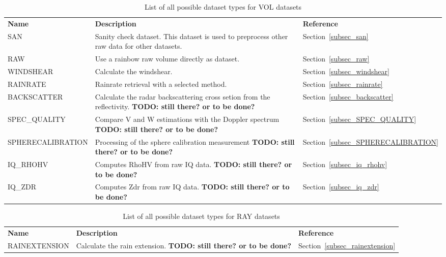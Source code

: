 \documentclass[a4paper,11pt,pdftex,twoside]{scrartcl}
\renewcommand{\bf}{\normalfont \bfseries}
\begin{document}
{{{\begin{table}[H]
\begin{tabularx}{\textwidth}{lXl}
\bf{Name}             & \bf{Description}                                                       & \bf{Reference}\\
SAN                   & Sanity check dataset. This dataset is used to preprocess other raw data for other datasets.   & Section~\ref{subsec_san}\\
RAW                   & Use a rainbow raw volume directly as dataset.                          & Section~\ref{subsec_raw}\\
WINDSHEAR             & Calculate the windshear.                                               & Section~\ref{subsec_windshear}\\
RAINRATE         & Rainrate retrieval with a selected method.                                                   & Section~\ref{subsec_rainrate}\\
BACKSCATTER           & Calculate the radar backscattering cross setion from the reflectivity. {\bf TODO: still there? or to be done? } & Section~\ref{subsec_backscatter}\\
SPEC\_QUALITY         & Compare V and W estimations with the Doppler spectrum {\bf TODO: still there? or to be done? }                 & Section~\ref{subsec_SPEC_QUALITY}\\
SPHERECALIBRATION     & Processing of the sphere calibration measurement   {\bf TODO: still there? or to be done? }                    & Section~\ref{subsec_SPHERECALIBRATION}\\
IQ\_RHOHV             & Computes RhoHV from raw IQ data.  {\bf TODO: still there? or to be done? }                                     & Section~\ref{subsec_iq_rhohv}\\
IQ\_ZDR               & Computes Zdr from raw IQ data.   {\bf TODO: still there? or to be done? }                                      & Section~\ref{subsec_iq_zdr}\\
\end{tabularx}
\caption{List of all possible dataset types for VOL datasets}
\label{tab_datasets_VOL}
\end{table}

\begin{table}[H]
\begin{tabularx}{\textwidth}{lXl}
\bf{Name}     & \bf{Description}                    & \bf{Reference}\\
RAINEXTENSION & Calculate the rain extension. {\bf TODO: still there? or to be done? }                                           & Section~\ref{subsec_rainextension}\\
\end{tabularx}
\caption{List of all possible dataset types for RAY datasets}
\label{tab_datasets_RAY}
\end{table}

}}}
\end{document}

